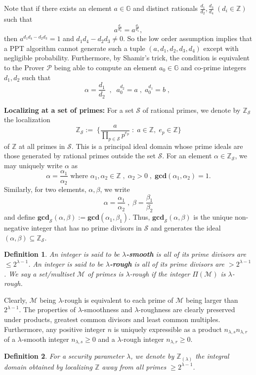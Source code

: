 \documentclass[11pt, lettersize, notitlepage, leqno, footskip=0.6cm]{article}
\newcommand{\bz}{\mathbb Z}
\newcommand{\pl}{\prod\limits}
\newcommand{\mc}{\mathcal}
\newcommand{\mb}{\mathbb}
\newcommand{\mbf}{\mathbf}
\newcommand{\al}{\alpha}
\newcommand{\be}{\beta}
\newcommand{\lam}{\lambda}
\newcommand{\lamb}{\lambda}
\newcommand{\sub}{\subseteq}
\newcommand{\mP}{\mc{P}}
\newcommand{\mcM}{\mc{M}}
\newcommand{\vs}{\vspace{-0.15cm}}
\newcommand{\noin}{\noindent}
\newcommand{\GCD}{\mbf{gcd}}
\newtheorem{Def}{Definition}[section]
\numberwithin{equation}{section}
\begin{document}
\noin Note that if there exists an element $a\in\mb{G}$ and distinct rationals $\frac{d_1}{d_2}, \frac{d_3}{d_4}\;(d_i\in\bz)$ such that \vs $$a^{\frac{d_1}{d_2}} = a^{\frac{d_3}{d_4}},$$ then $a^{d_1d_4-d_2d_3} = 1$ and $d_1d_4-d_2d_3\neq 0$. So the low order assumption implies that a PPT algorithm cannot generate such a tuple $(a,d_1,d_2,d_3,d_4)$ except with negligible probability. Furthermore, by Shamir's trick, the condition is equivalent to the Prover $\mP$ being able to compute an element $a_0\in\mb{G}$ and co-prime integers $d_1,d_2$ such that \vs $$\al = \frac{d_1}{d_2}\;\;,\;\;a_0^{d_2} =a\;,\; a_0^{d_1} =b\;,\; $$


\noin \textbf{Localizing at a set of primes:} For a set $\mc{S}$ of rational primes, we denote by $\bz_{\mc{S}}$ the localization \vs $$\bz_{\mc{S}}:= \;\Big\{\frac{a}{\pl_{p\in \mc{S}} p^{e_p}}\;:\;a\in\bz,\; e_p\in \bz \Big\} $$ of $\bz$ at all primes in $\mc{S}$. This is a principal ideal domain whose prime ideals are those generated by rational primes outside the set $\mc{S}$. For an element $\al\in \bz_{\mc{S}}$, we may uniquely write $\al$ as $$\al = \frac{\al_1}{\al_2} \text{ where } \al_1,\al_2\in \bz\;,\; \al_2>0\;,\;\GCD(\al_1,\al_2) = 1.$$ Similarly, for two elements, $\al,\be$, we write \vs $$\al = \frac{\al_1}{\al_2}\;,\; \be = \frac{\be_1}{\be_2}$$ and define $\GCD_{\mc{S}}(\al,\be):= \GCD(\al_1,\be_1)$. Thus, $\GCD_{\mc{S}}(\al,\be)$ is the unique non-negative integer that has no prime divisors in $\mc{S}$ and generates the ideal $(\al,\be)\sub \bz_{\mc{S}}$.


\begin{Def} An integer is said to be \textbf{$\lamb$-smooth} is all of its prime divisors are $\leq 2^{\lamb-1}$. An integer is said to be \textbf{$\lamb$-rough} is all of its prime divisors are $> 2^{\lam-1}$. We say a set/multiset $\mcM$ of primes is $\lam$-rough if the integer $\Pi(\mcM)$ is $\lam$-rough. \end{Def}

Clearly, $\mcM$ being $\lam$-rough is equivalent to each prime of $\mcM$ being larger than $2^{\lam-1}$. The properties of $\lamb$-smoothness and $\lamb$-roughness are clearly preserved under products, greatest common divisors and least common multiples. Furthermore, any positive integer $n$ is uniquely expressible as a product $n_{{\lam,s}}n_{{\lam,r}}$ of a $\lam$-smooth integer $n_{{\lam,s}}\geq 0$ and a $\lam$-rough integer $n_{{\lam,r}}\geq 0$.

\begin{Def} For a security parameter $\lamb$, we denote by $\bz_{(\lamb)}$ the integral domain obtained by localizing $\bz$ away from all primes $\geq 2^{\lamb-1}$. \end{Def}
\end{document}
